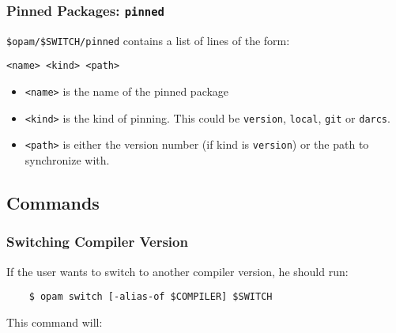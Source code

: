 \documentclass[a4paper,10pt]{article}
\begin{document}
\subsubsection{Pinned Packages: {\tt pinned}}
\label{file:pinned}

\verb+$opam/$SWITCH/pinned+ contains a list of lines of the form:

\begin{Verbatim}
<name> <kind> <path>
\end{Verbatim}

\begin{itemize}
\item \verb+<name>+ is the name of the pinned package

\item \verb+<kind>+ is the kind of pinning. This could be \verb+version+,
\verb+local+, \verb+git+ or \verb+darcs+.

\item \verb+<path>+ is either the version number (if kind is
  \verb+version+) or the path to synchronize with.
\end{itemize}

\subsection{Commands}

\subsubsection{Switching Compiler Version}

If the user wants to switch to another compiler version, he should run:

\begin{verbatim}
    $ opam switch [-alias-of $COMPILER] $SWITCH
\end{verbatim}

This command will:
\end{document}
